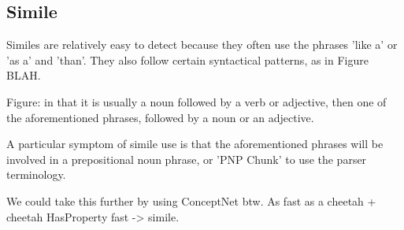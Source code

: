 \subsection{Simile}

Similes are relatively easy to detect because they often use the phrases 'like a' or 'as a' and 'than'. They also follow certain syntactical patterns, as in Figure BLAH.

Figure: in that it is usually a noun followed by a verb or adjective, then one of the aforementioned phrases, followed by a noun or an adjective.

A particular symptom of simile use is that the aforementioned phrases will be involved in a prepositional noun phrase, or 'PNP Chunk' to use the parser terminology.

We could take this further by using ConceptNet btw. As fast as a cheetah + cheetah HasProperty fast -> simile.




